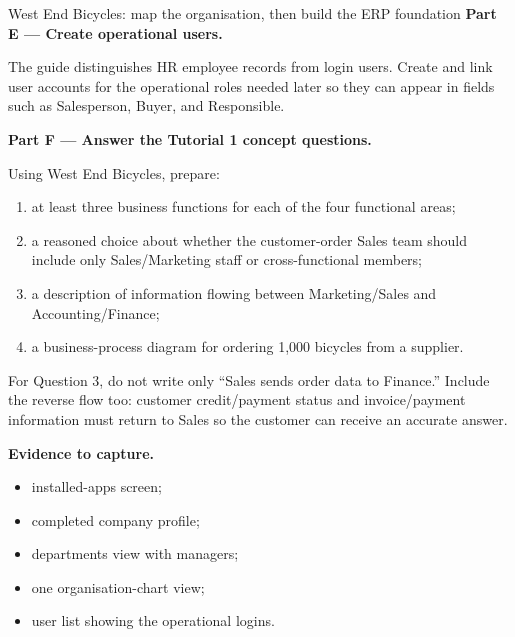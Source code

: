 \begin{labproject}{West End Bicycles: map the organisation, then build the ERP foundation}
\medskip\noindent\textbf{Part E --- Create operational users.}

The guide distinguishes HR employee records from login users. Create and link user accounts for the operational roles needed later so they can appear in fields such as Salesperson, Buyer, and Responsible.

\medskip\noindent\textbf{Part F --- Answer the Tutorial 1 concept questions.}

Using West End Bicycles, prepare:
\begin{enumerate}
  \item at least three business functions for each of the four functional areas;
  \item a reasoned choice about whether the customer-order Sales team should include only Sales/Marketing staff or cross-functional members;
  \item a description of information flowing between Marketing/Sales and Accounting/Finance;
  \item a business-process diagram for ordering 1,000 bicycles from a supplier.
\end{enumerate}

\begin{tryit}
For Question 3, do not write only ``Sales sends order data to Finance.'' Include the reverse flow too: customer credit/payment status and invoice/payment information must return to Sales so the customer can receive an accurate answer.
\end{tryit}

\medskip\noindent\textbf{Evidence to capture.}
\begin{itemize}
  \item installed-apps screen;
  \item completed company profile;
  \item departments view with managers;
  \item one organisation-chart view;
  \item user list showing the operational logins.
\end{itemize}
\end{labproject}



